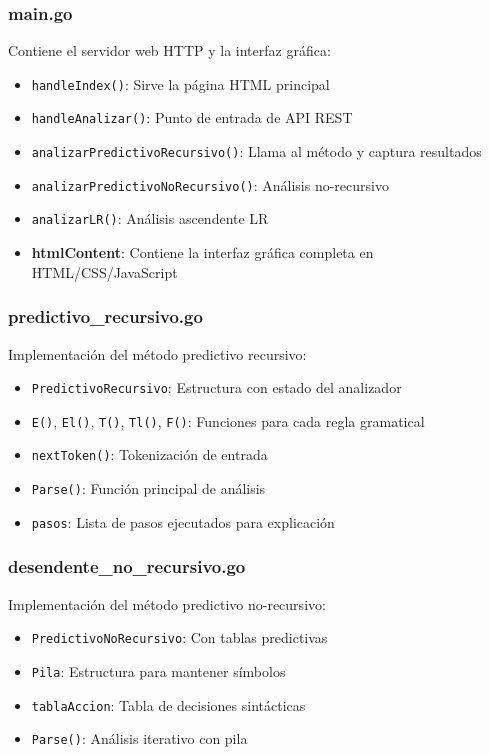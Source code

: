 \documentclass[12pt]{article}
\begin{document}
\subsubsection{main.go}

Contiene el servidor web HTTP y la interfaz gráfica:

\begin{itemize}
    \item \texttt{handleIndex()}: Sirve la página HTML principal
    \item \texttt{handleAnalizar()}: Punto de entrada de API REST
    \item \texttt{analizarPredictivoRecursivo()}: Llama al método y captura resultados
    \item \texttt{analizarPredictivoNoRecursivo()}: Análisis no-recursivo
    \item \texttt{analizarLR()}: Análisis ascendente LR
    \item \textbf{htmlContent}: Contiene la interfaz gráfica completa en HTML/CSS/JavaScript
\end{itemize}

\subsubsection{predictivo\_recursivo.go}

Implementación del método predictivo recursivo:

\begin{itemize}
    \item \texttt{PredictivoRecursivo}: Estructura con estado del analizador
    \item \texttt{E()}, \texttt{El()}, \texttt{T()}, \texttt{Tl()}, \texttt{F()}: Funciones para cada regla gramatical
    \item \texttt{nextToken()}: Tokenización de entrada
    \item \texttt{Parse()}: Función principal de análisis
    \item \texttt{pasos}: Lista de pasos ejecutados para explicación
\end{itemize}

\subsubsection{desendente\_no\_recursivo.go}

Implementación del método predictivo no-recursivo:

\begin{itemize}
    \item \texttt{PredictivoNoRecursivo}: Con tablas predictivas
    \item \texttt{Pila}: Estructura para mantener símbolos
    \item \texttt{tablaAccion}: Tabla de decisiones sintácticas
    \item \texttt{Parse()}: Análisis iterativo con pila
\end{itemize}
\end{document}
